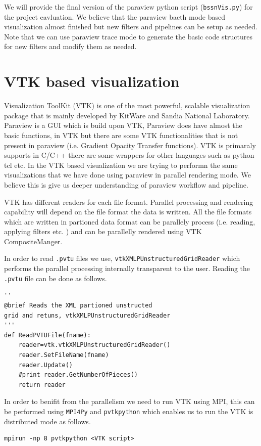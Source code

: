 We will provide the final version of the paraview python script (\texttt{bssnVis.py}) for the project eavluation. We believe that the paraview bacth mode based visualization almost finished but new filters and pipelines can be setup as needed.
Note that we can use paraview trace mode to generate the basic code structures for new filters and modify them as needed. 

\section{VTK based visualization }
Visualization ToolKit (VTK) is one of the most powerful, scalable visualization package that is mainly developed by KitWare and Sandia National Laboratory. Paraview is a GUI which is build upon VTK, Paraview does have almost the basic functions, 
in VTK but there are some VTK functionalities that is not present in paraview (i.e. Gradient Opacity Transfer functions). VTK is primaraly supports in C/C++ there are some wrappers for other languages such as python tcl etc. In the VTK based visualization 
we are trying to performn the same visualizations that we have done using paraview in parallel rendering mode. We believe this is give us deeper understanding of paraview workflow and pipeline. 

VTK has different readers for each file format. Parallel processing and rendering capability will depend on the file format the data is written. All the file formats which are written in partioned data format can be parallely process (i.e. reading, applying filters etc. )
and can be parallelly rendered using VTK CompositeManger. 

In order to read \texttt{.pvtu} files we use, \texttt{vtkXMLPUnstructuredGridReader} which performs the parallel processing internally transparent to the user. Reading the \texttt{.pvtu} file can be done as follows. 
\begin{lstlisting}[basicstyle=\small]
''
@brief Reads the XML partioned unstructed 
grid and retuns, vtkXMLPUnstructuredGridReader
'''
def ReadPVTUFile(fname):
    reader=vtk.vtkXMLPUnstructuredGridReader()
    reader.SetFileName(fname)
    reader.Update()
    #print reader.GetNumberOfPieces()
    return reader
\end{lstlisting}

In order to benifit from the parallelism we need to run VTK using MPI, this can be performed using \texttt{MPI4Py} and \texttt{pvtkpython} which enables us to run the VTK is distributed mode as follows.
\begin{lstlisting}[basicstyle=\small]
    mpirun -np 8 pvtkpython <VTK script>
\end{lstlisting} 

